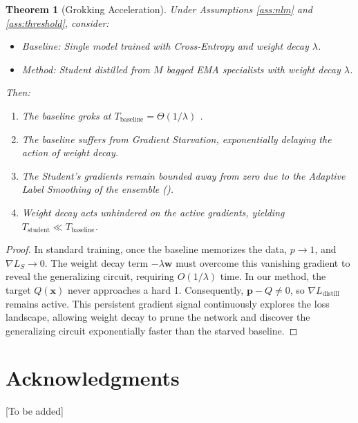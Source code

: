 \documentclass[11pt,a4paper]{article}
\theoremstyle{definition}
\theoremstyle{plain}
\newtheorem{theorem}{Theorem}[section]
\theoremstyle{remark}
\newcommand{\w}{\mathbf{w}}
\newcommand{\x}{\mathbf{x}}
\newcommand{\p}{\mathbf{p}}
\begin{document}
\begin{theorem}[Grokking Acceleration]
\label{thm:main}
Under Assumptions \ref{ass:nlm} and \ref{ass:threshold}, consider:
\begin{itemize}
    \item Baseline: Single model trained with Cross-Entropy and weight decay $\lambda$.
    \item Method: Student distilled from $M$ bagged EMA specialists with weight decay $\lambda$.
\end{itemize}
Then:
\begin{enumerate}[(1)]
    \item The baseline groks at $T_{\text{baseline}} = \Theta(1/\lambda)$ \cite{prieto2025grokking}.
    \item The baseline suffers from Gradient Starvation, exponentially delaying the action of weight decay.
    \item The Student's gradients remain bounded away from zero due to the Adaptive Label Smoothing of the ensemble ().
    \item Weight decay acts unhindered on the active gradients, yielding $T_{\text{student}} \ll T_{\text{baseline}}$.
\end{enumerate}
\end{theorem}
\begin{proof}
In standard training, once the baseline memorizes the data, $p \to 1$, and $\nabla L_S \to 0$. The weight decay term $-\lambda \w$ must overcome this vanishing gradient to reveal the generalizing circuit, requiring $O(1/\lambda)$ time. In our method, the target $Q(\x)$ never approaches a hard 1. Consequently, $\p - Q \neq 0$, so $\nabla L_{\text{distill}}$ remains active. This persistent gradient signal continuously explores the loss landscape, allowing weight decay to prune the network and discover the generalizing circuit exponentially faster than the starved baseline.
\end{proof}

\section*{Acknowledgments}
[To be added]
\end{document}
